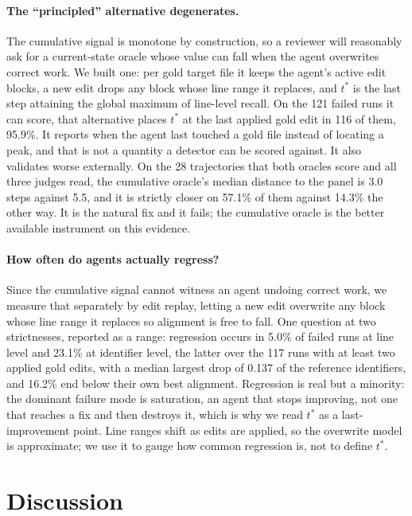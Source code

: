 \documentclass[sigconf,screen]{acmart}
\begin{document}
\paragraph{The ``principled'' alternative degenerates.} The cumulative signal is monotone by
construction, so a reviewer will reasonably ask for a current-state oracle whose value can fall when
the agent overwrites correct work. We built one: per gold target file it keeps the agent's active
edit blocks, a new edit drops any block whose line range it replaces, and $t^{*}$ is the last step
attaining the global maximum of line-level recall. On the 121 failed runs it can score, that
alternative places $t^{*}$ at the last applied gold edit in 116 of them, 95.9\%. It reports when the agent last touched a gold file instead of locating a peak,
and that is not a quantity a detector can be scored against. It also validates worse externally. On the 28 trajectories that both oracles
score and all three judges read, the cumulative oracle's median distance to the panel is 3.0 steps
against 5.5, and it is strictly closer on 57.1\% of them against 14.3\% the other way. It is the
natural fix and it fails; the cumulative oracle is the better available instrument on this
evidence.

\paragraph{How often do agents actually regress?} Since the cumulative signal cannot witness an
agent undoing correct work, we measure that separately by edit replay, letting a new edit overwrite
any block whose line range it replaces so alignment is free to fall. One question at two strictnesses, reported as a range: regression occurs in 5.0\% of failed runs at
line level and 23.1\% at identifier level, the latter over the 117 runs with at least two applied
gold edits, with a median largest drop of 0.137 of the reference identifiers, and 16.2\% end below
their own best alignment. Regression is real but a minority: the dominant failure mode is
saturation, an agent that stops improving, not one that reaches a fix and then destroys it, which is
why we read $t^{*}$ as a last-improvement point. Line ranges shift as edits are applied, so the
overwrite model is approximate; we use it to gauge how common regression is, not to define $t^{*}$.

\section{Discussion}
\label{sec:discussion}
\end{document}

